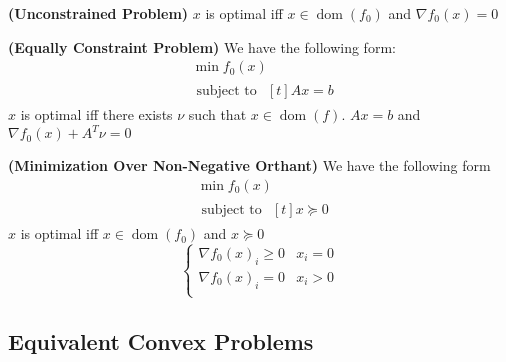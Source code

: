 \begin{definition}{\textbf{(Unconstrained Problem)}}
    $x$ is optimal iff $x\in\operatorname{dom}(f_0)$ and $\nabla f_0(x) = 0$
\end{definition}

\begin{definition}{\textbf{(Equally Constraint Problem)}}
    We have the following form:
    \begin{equation*}
    \begin{aligned}
        &\min f_0(x) \\
        &\text{ subject to } \begin{aligned}[t]
            Ax = b
        \end{aligned}
    \end{aligned}
    \end{equation*} 
    $x$ is optimal iff there exists $\nu$ such that $x\in\operatorname{dom}(f)$. $Ax=b$ and $\nabla f_0(x) + A^T\nu = 0$
\end{definition}

\begin{definition}{\textbf{(Minimization Over Non-Negative Orthant)}}
    We have the following form
    \begin{equation*}
    \begin{aligned}
        &\min f_0(x) \\
        &\text{ subject to } \begin{aligned}[t]
            x \succeq 0
        \end{aligned}
    \end{aligned}
    \end{equation*} 
    $x$ is optimal iff $x\in\operatorname{dom}(f_0)$ and $x\succeq0$
    \begin{equation*}
        \begin{cases}
            \nabla f_0(x)_i\ge0 & x_i=0 \\
            \nabla f_0(x)_i=0 & x_i>0 \\
        \end{cases}
    \end{equation*}
\end{definition}

\subsection{Equivalent Convex Problems}


